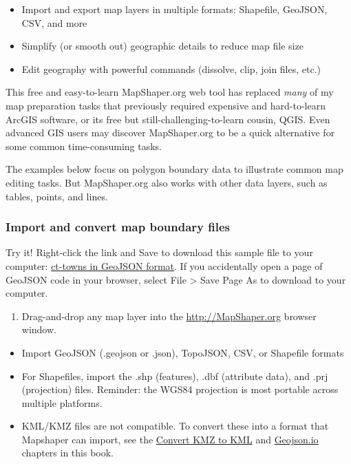 \documentclass[
  english,
]{book}
\providecommand{\tightlist}{%
  \setlength{\itemsep}{0pt}\setlength{\parskip}{0pt}}
\begin{document}
\begin{itemize}
\tightlist
\item
  Import and export map layers in multiple formats: Shapefile, GeoJSON, CSV, and more
\item
  Simplify (or smooth out) geographic details to reduce map file size
\item
  Edit geography with powerful commands (dissolve, clip, join files, etc.)
\end{itemize}

This free and easy-to-learn MapShaper.org web tool has replaced \emph{many} of my map preparation tasks that previously required expensive and hard-to-learn ArcGIS software, or its free but still-challenging-to-learn cousin, QGIS. Even advanced GIS users may discover MapShaper.org to be a quick alternative for some common time-consuming tasks.

The examples below focus on polygon boundary data to illustrate common map editing tasks. But MapShaper.org also works with other data layers, such as tables, points, and lines.

\hypertarget{import-and-convert-map-boundary-files}{%
\subsubsection*{Import and convert map boundary files}\label{import-and-convert-map-boundary-files}}

Try it! Right-click the link and Save to download this sample file to your computer: \href{data/ct-towns.geojson}{ct-towns in GeoJSON format}. If you accidentally open a page of GeoJSON code in your browser, select File \textgreater{} Save Page As to download to your computer.

\begin{enumerate}
\def\labelenumi{\arabic{enumi}.}
\tightlist
\item
  Drag-and-drop any map layer into the \url{http://MapShaper.org} browser window.
\end{enumerate}

\begin{itemize}
\tightlist
\item
  Import GeoJSON (.geojson or .json), TopoJSON, CSV, or Shapefile formats
\item
  For Shapefiles, import the .shp (features), .dbf (attribute data), and .prj (projection) files. Reminder: the WGS84 projection is most portable across multiple platforms.
\item
  KML/KMZ files are not compatible. To convert these into a format that Mapshaper can import, see the \href{convert-kmz}{Convert KMZ to KML} and \href{geojsonio}{Geojson.io} chapters in this book.
\end{itemize}
\end{document}
